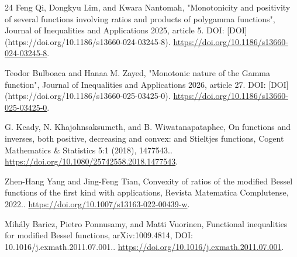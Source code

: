 \documentclass[11pt]{article}
\numberwithin{equation}{section}
\theoremstyle{definition}
\theoremstyle{remark}
\newcommand{\1}{\mathbf 1}
\begin{document}
\begin{thebibliography}{24}
Feng Qi, Dongkyu Lim, and Kwara Nantomah, "Monotonicity and positivity of several functions involving ratios and products of polygamma functions", Journal of Inequalities and Applications 2025, article 5. DOI: [DOI](https://doi.org/10.1186/s13660-024-03245-8).
\url{https://doi.org/10.1186/s13660-024-03245-8}.

Teodor Bulboaca and Hanaa M. Zayed, "Monotonic nature of the Gamma function", Journal of Inequalities and Applications 2026, article 27. DOI: [DOI](https://doi.org/10.1186/s13660-025-03425-0).
\url{https://doi.org/10.1186/s13660-025-03425-0}.

G. Keady, N. Khajohnsaksumeth, and B. Wiwatanapataphee, On functions and inverses, both positive, decreasing and convex: and Stieltjes functions, Cogent Mathematics \& Statistics 5:1 (2018), 1477543..
\url{https://doi.org/10.1080/25742558.2018.1477543}.

Zhen-Hang Yang and Jing-Feng Tian, Convexity of ratios of the modified Bessel functions of the first kind with applications, Revista Matematica Complutense, 2022..
\url{https://doi.org/10.1007/s13163-022-00439-w}.

Mihály Baricz, Pietro Ponnusamy, and Matti Vuorinen, Functional inequalities for modified Bessel functions, arXiv:1009.4814, DOI: 10.1016/j.exmath.2011.07.001..
\url{https://doi.org/10.1016/j.exmath.2011.07.001}.

\end{thebibliography}
\end{document}
